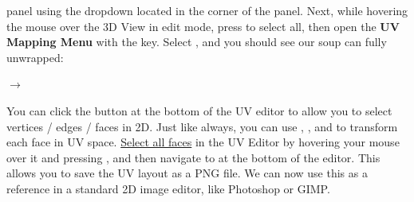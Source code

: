 \documentclass[11pt]{article}
\begin{document}
panel using the dropdown located in the corner of the panel.  Next, while hovering the mouse over
the 3D View in edit mode, press  to select all, then open the \textbf{UV Mapping Menu}
with the  key.  Select , and you should see our soup can fully unwrapped:
\begin{center}
     $\rightarrow$
\end{center}
You can click the  button at the bottom of the UV
editor to allow you to select vertices / edges / faces in 2D.  Just like always, you can use 
, , and  to transform each face in UV space.  \underline{Select all faces} in the
UV Editor by hovering your mouse over it and pressing , and then navigate to
 at the bottom of the editor.  This allows you to save the UV layout as a
PNG file.  We can now use this as a reference in a standard 2D image editor, like Photoshop or GIMP.
\end{document}
